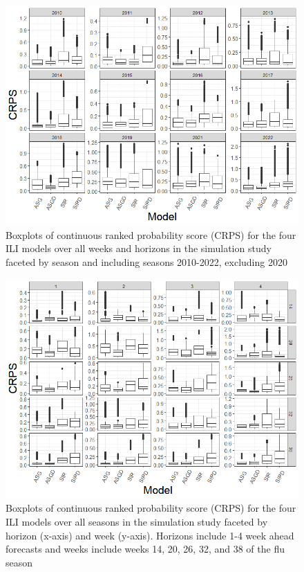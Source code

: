 \documentclass[ba]{imsart}
\theoremstyle{plain}
\theoremstyle{definition}
\theoremstyle{remark}
\begin{document}
\begin{figure}
    \centering
    \includegraphics[scale=.5]{Images/crps_by_season.png}
    \caption{Boxplots of continuous ranked probability score (CRPS) for the four ILI models over all weeks and horizons in the simulation study faceted by season and including seasons 2010-2022, excluding 2020}
    \label{fig:crps_by_season}
\end{figure}

\begin{figure}
    \centering
    \includegraphics[scale=.5]{Images/crps_by_week_horizon.png}
    \caption{Boxplots of continuous ranked probability score (CRPS) for the four ILI models over all seasons in the simulation study faceted by horizon (x-axis) and week (y-axis). Horizons include 1-4 week ahead forecasts and weeks include weeks 14, 20, 26, 32, and 38 of the flu season}
    \label{fig:crps_by_week_horizon}
\end{figure}
\end{document}
